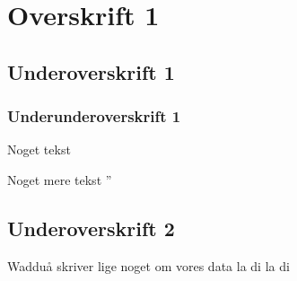 \section{Overskrift 1}

\subsection{Underoverskrift 1}

\subsubsection{Underunderoverskrift 1}

Noget tekst

Noget mere tekst
''
\subsection{Underoverskrift 2}
Wadduå skriver lige noget om vores data la di la di
